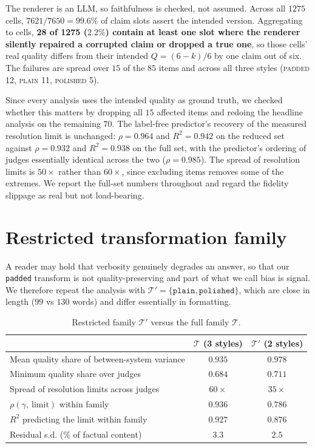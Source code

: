 \documentclass{article}
\theoremstyle{plain}
\theoremstyle{definition}
\newcommand{\bgap}{\gamma}
\begin{document}
The renderer is an LLM, so faithfulness is checked, not assumed. Across all $1275$ cells,
$7621/7650 = 99.6\%$ of claim slots assert the intended version. Aggregating to cells,
\textbf{28 of 1275 ($2.2\%$) contain at least one slot where the renderer silently repaired a
corrupted claim or dropped a true one}, so those cells' real quality differs from their intended
$Q=(6-k)/6$ by one claim out of six. The failures are spread over $15$ of the $85$ items and
across all three styles (\textsc{padded} 12, \textsc{plain} 11, \textsc{polished} 5).

Since every analysis uses the intended quality as ground truth, we checked whether this matters
by dropping all $15$ affected items and redoing the headline analysis on the remaining $70$.
The label-free predictor's recovery of the measured resolution limit is unchanged:
$\rho = 0.964$ and $R^2 = 0.942$ on the reduced set against $\rho = 0.932$ and $R^2 = 0.938$ on
the full set, with the predictor's ordering of judges essentially identical across the two
($\rho = 0.985$). The spread of resolution limits is $50\times$ rather than $60\times$, since
excluding items removes some of the extremes. We report the full-set numbers throughout and
regard the fidelity slippage as real but not load-bearing.

\section{Restricted transformation family}
\label{app:restricted}

A reader may hold that verbosity genuinely degrades an answer, so that our \texttt{padded}
transform is not quality-preserving and part of what we call bias is signal. We therefore
repeat the analysis with $\mathcal{T}'=\{\texttt{plain},\texttt{polished}\}$, which are close
in length ($99$ vs $130$ words) and differ essentially in formatting.

\begin{table}[h]
\caption{Restricted family $\mathcal{T}'$ versus the full family $\mathcal{T}$.}
\centering\small
\begin{tabular}{lcc}
\toprule
& $\mathcal{T}$ (3 styles) & $\mathcal{T}'$ (2 styles) \\
\midrule
Mean quality share of between-system variance & $0.935$ & $0.978$ \\
Minimum quality share over judges             & $0.684$ & $0.711$ \\
Spread of resolution limits across judges     & $60\times$ & $35\times$ \\
$\rho(\bgap,\ \text{limit})$ within family  & $0.936$ & $0.786$ \\
$R^2$ predicting the limit within family      & $0.927$ & $0.876$ \\
Residual s.d. (\% of factual content)         & $3.3$ & $2.5$ \\
\bottomrule
\end{tabular}
\end{table}
\end{document}
